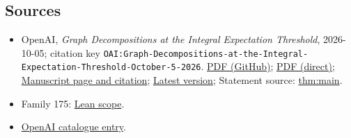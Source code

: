 \documentclass[11pt]{article}
\begin{document}
\subsection{Sources}
\begin{itemize}
\item OpenAI, \emph{Graph Decompositions at the Integral Expectation Threshold}, 2026-10-05; citation key \texttt{OAI:Graph-Decompositions-at-the-Integral-Expectation-Threshold-October-5-2026}. \href{https://github.com/openai/math/blob/adc7f1241b42e322a6451854ab7e4b4c146bf78a/preprints/Graph-Decompositions-at-the-Integral-Expectation-Threshold-October-5-2026/graph-threshold-decompositions.pdf}{PDF (GitHub)}; \href{https://github.com/openai/math/raw/adc7f1241b42e322a6451854ab7e4b4c146bf78a/preprints/Graph-Decompositions-at-the-Integral-Expectation-Threshold-October-5-2026/graph-threshold-decompositions.pdf}{PDF (direct)}; \href{https://github.com/openai/math/blob/adc7f1241b42e322a6451854ab7e4b4c146bf78a/preprints/Graph-Decompositions-at-the-Integral-Expectation-Threshold-October-5-2026/README.md}{Manuscript page and citation}; \href{https://github.com/openai/math/blob/main/preprints/Graph-Decompositions-at-the-Integral-Expectation-Threshold-October-5-2026/graph-threshold-decompositions.pdf}{Latest version}; Statement source: \href{https://github.com/openai/math/blob/adc7f1241b42e322a6451854ab7e4b4c146bf78a/preprints/Graph-Decompositions-at-the-Integral-Expectation-Threshold-October-5-2026/build/main.tex\#L80}{thm:main}.
\item Family 175: \href{https://github.com/openai/math/blob/adc7f1241b42e322a6451854ab7e4b4c146bf78a/lean/docs/175.md}{Lean scope}.
\item \href{https://github.com/openai/math/blob/adc7f1241b42e322a6451854ab7e4b4c146bf78a/CONTENTS.md}{OpenAI catalogue entry}.
\end{itemize}
\end{document}
